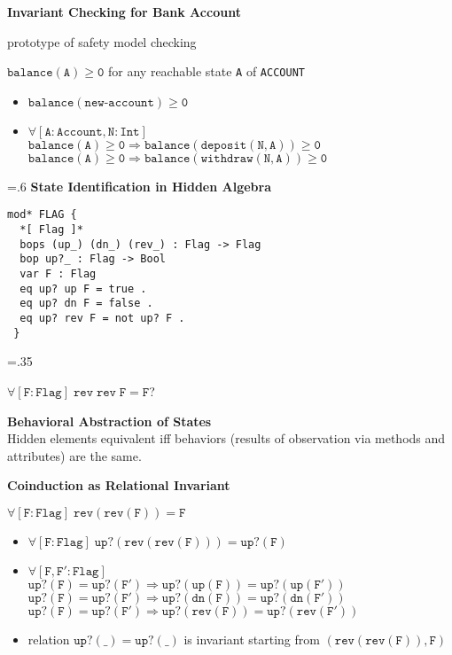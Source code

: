 \documentclass[landscape]{slides}
\begin{document}
\begin{slide}\large\parskip=0pt
\textbf{Invariant Checking for Bank Account}

\bigskip prototype of safety model checking

\bigskip\bigskip

$\mathtt{balance(A)\geq 0}$ for any reachable state \texttt{A} of
\texttt{ACCOUNT}

\bigskip

\begin{itemize}\itemsep=0pt
\item $\mathtt{balance(new\texttt{-}account)\geq 0}$
\item $\mathtt{\forall[A:Account,N:Int]}$\\
  $\mathtt{balance(A)\geq 0\Rightarrow balance(deposit(N,A))\geq 0}$\\
  $\mathtt{balance(A)\geq 0\Rightarrow balance(withdraw(N,A))\geq 0}$
\end{itemize}
\end{slide}

\begin{slide}\large\parskip=0pt\baselineskip=.6\baselineskip
\textbf{State Identification in Hidden Algebra}

\bigskip

\begin{verbatim}
mod* FLAG {
  *[ Flag ]*
  bops (up_) (dn_) (rev_) : Flag -> Flag
  bop up?_ : Flag -> Bool
  var F : Flag
  eq up? up F = true .
  eq up? dn F = false .
  eq up? rev F = not up? F .
 }
\end{verbatim}

\hfil\epsfysize=.35\textheight{}\hfil

\bigskip

\hfil$\mathtt{\forall[F:Flag]\;rev\; rev\; F = F}$?\hfil

\end{slide}

\begin{slide}\large\parskip=0pt
  \textbf{Behavioral Abstraction of States}\\
  Hidden elements equivalent iff behaviors (results of observation via
  methods and attributes) are the same.

\bigskip

\textbf{Coinduction as Relational Invariant}

$\mathtt{\forall[F:Flag]\; rev(rev(F))=F}$
\begin{itemize}\itemsep=0pt
\item $\mathtt{\forall[F:Flag]\; up?(rev(rev(F)))=up?(F)}$
\item $\mathtt{\forall[F,F':Flag]}$\\
  $\mathtt{up?(F)=up?(F')\Rightarrow up?(up(F))=up?(up(F'))}$\\
  $\mathtt{up?(F)=up?(F')\Rightarrow up?(dn(F))=up?(dn(F'))}$\\
  $\mathtt{up?(F)=up?(F')\Rightarrow up?(rev(F))=up?(rev(F'))}$
\item relation $\mathtt{up?(\_)=up?(\_)}$ is invariant starting from
  $\mathtt{(rev(rev(F)),F)}$
\end{itemize}

\end{slide}
\end{document}
